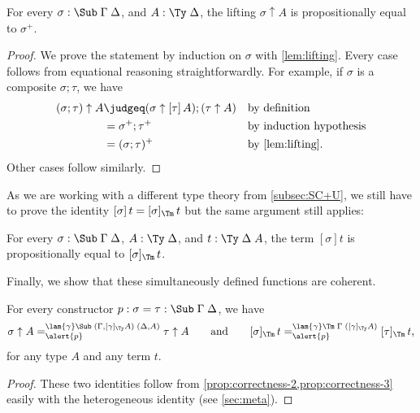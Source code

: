 \documentclass[a4paper,UKenglish,numberwithinsect,cleveref,thm-restate]{lipics-v2021}
\newcommand{\danger}{\marginpar[\hfill\dbend]{\dbend\hfill}}
\begin{document}
\begin{proposition} \label{prop:correctness-2}
  For every $\sigma : \Sub\;\Gamma\;\Delta$, and $A : \Ty\;\Delta$, the lifting
  $\sigma \uparrow A$ is propositionally equal to $\sigma^+$. 
\end{proposition}
\begin{proof}
  We prove the statement by induction on $\sigma$ with \cref{lem:lifting}.
  Every case follows from equational reasoning straightforwardly.
  For example, if $\sigma$ is a composite $\sigma;\tau$, we have
  \begin{align*}
    (\sigma;\tau) \uparrow A & \judgeq (\sigma \uparrow [\tau]\,A);(\tau \uparrow A) && \text{by definition} \\
                             & = \sigma^+;\tau^+                                     && \text{by induction hypothesis} \\ 
                             & = (\sigma;\tau)^+                                     && \text{by \cref{lem:lifting}.} 
  \end{align*}
  Other cases follow similarly.
\end{proof}

As we are working with a different type theory from \cref{subsec:SC+U}, we still have to prove the identity $[\sigma]\,t = [\sigma]_{\Tm}\,t$ but the same argument still applies:
\begin{proposition} \label{prop:correctness-3}
  For every $\sigma : \Sub\;\Gamma\;\Delta$, $A : \Ty\;\Delta$, and $t : \Ty\;\Delta\;A$,
  the term $[\sigma]t$ is propositionally equal to $[\sigma]_{\Tm}\,t$.
\end{proposition}

Finally, we show that these simultaneously defined functions are coherent.
\begin{proposition}[Coherence]
  For every constructor $p : \sigma = \tau : \Sub\;\Gamma\;\Delta$, we have
  \danger
  \[
    \sigma \uparrow A =^{\lam{\gamma}\Sub\;(\Gamma, [ \gamma ]_{\Ty} A)\;(\Delta, A)}_{\alert{p}} \tau \uparrow A
    \qquad\text{and}\qquad
    [\sigma]_{\Tm}\,t =^{\lam{\gamma}\Tm\;\Gamma\;([\gamma]_{\Ty}A)}_{\alert{p}} [\tau]_{\Tm}\,t,
  \]
  for any type $A$ and any term $t$.
\end{proposition}
\begin{proof}
  These two identities follow from \cref{prop:correctness-2,prop:correctness-3} easily with the heterogeneous identity (see \cref{sec:meta}).
\end{proof}
\end{document}
